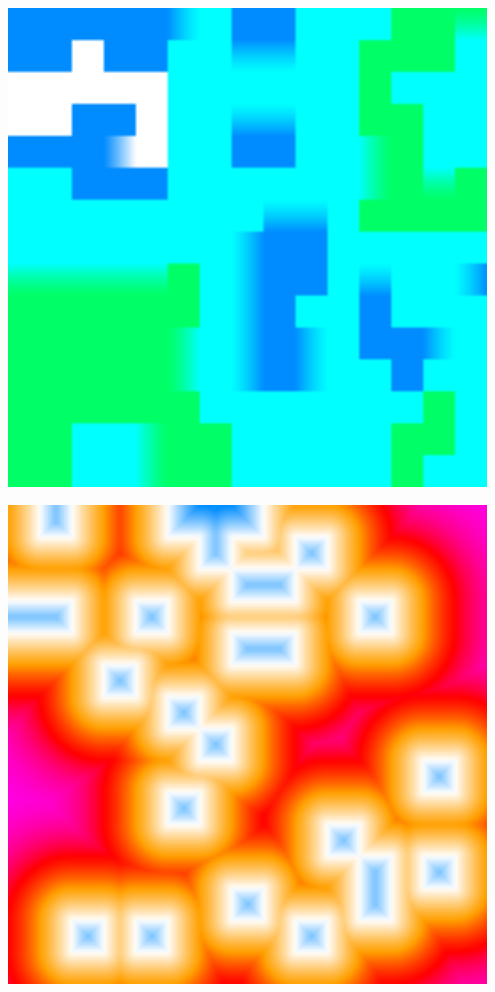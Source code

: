 \begin{center}
\begin{minipage}{.07\textwidth}
        \small{\ \\\ \\\ }
    \end{minipage}%
    \begin{minipage}{.31\textwidth}
        \centering
        \includegraphics[width=0.95\textwidth]{img/heights.png}
        \small{}
        \label{fig:height-fn}
    \end{minipage}%
    \begin{minipage}{.31\textwidth}
        \centering
        \includegraphics[width=0.95\textwidth]{img/obstacle sdf.png}

\end{minipage}
\end{center}
